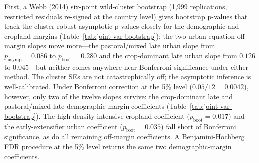 \documentclass[11pt,letterpaper]{article}
\begin{document}
First, a Webb (2014) six-point wild-cluster bootstrap (1{,}999 replications, restricted residuals re-signed at the country level) gives bootstrap p-values that track the cluster-robust asymptotic p-values closely for the demographic and cropland margins (Table~\ref{tab:joint-var-bootstrap}); the two urban-equation off-margin slopes move more---the pastoral/mixed late urban slope from $p_{\text{asymp}}=0.086$ to $p_{\text{boot}}=0.280$ and the crop-dominant late urban slope from $0.126$ to $0.045$---but neither comes anywhere near Bonferroni significance under either method. The cluster SEs are not catastrophically off; the asymptotic inference is well-calibrated. Under Bonferroni correction at the 5\% level ($0.05 / 12 = 0.0042$), however, only two of the twelve slopes survive: the crop-dominant late and pastoral/mixed late demographic-margin coefficients (Table~\ref{tab:joint-var-bootstrap}). The high-density intensive cropland coefficient ($p_{\text{boot}} = 0.017$) and the early-extensifier urban coefficient ($p_{\text{boot}} = 0.035$) fall short of Bonferroni significance, as do all remaining off-margin coefficients. A Benjamini-Hochberg FDR procedure at the 5\% level returns the same two demographic-margin coefficients.
\end{document}
